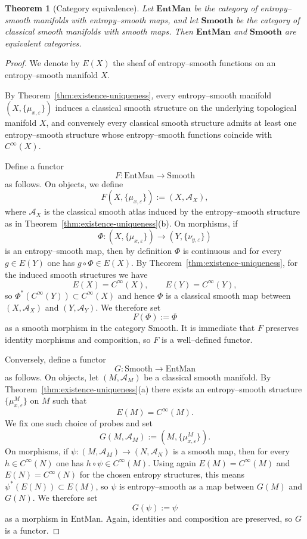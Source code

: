 \documentclass[11pt]{amsart}
\newtheorem{theorem}{Theorem}[section]
\theoremstyle{definition}
\theoremstyle{remark}
\begin{document}
\begin{theorem}[Category equivalence]
\label{thm:category-equivalence}
Let $\mathbf{EntMan}$ be the category of entropy--smooth manifolds with
entropy--smooth maps, and let $\mathbf{Smooth}$ be the category of
classical smooth manifolds with smooth maps.  Then $\mathbf{EntMan}$ and
$\mathbf{Smooth}$ are equivalent categories.
\end{theorem}
\begin{proof}
We denote by $E(X)$ the sheaf of entropy--smooth functions on an entropy--smooth
manifold $X$.

By Theorem~\ref{thm:existence-uniqueness}, every entropy--smooth manifold $(X,\{\mu_{x,\varepsilon}\})$ induces a
classical smooth structure on the underlying topological manifold $X$, and conversely
every classical smooth structure admits at least one entropy--smooth structure whose
entropy--smooth functions coincide with $C^\infty(X)$.

Define a functor
\[
F : \mathrm{EntMan} \longrightarrow \mathrm{Smooth}
\]
as follows. On objects, we define
\[
F(X,\{\mu_{x,\varepsilon}\}) := (X,\mathcal{A}_X),
\]
where $\mathcal{A}_X$ is the classical smooth atlas induced by the entropy--smooth
structure as in Theorem~\ref{thm:existence-uniqueness}(b). On morphisms, if
\[
\Phi:(X,\{\mu_{x,\varepsilon}\}) \longrightarrow (Y,\{\nu_{y,\varepsilon}\})
\]
is an entropy--smooth map, then by definition $\Phi$ is continuous and for every
$g\in E(Y)$ one has $g\circ \Phi \in E(X)$. By Theorem~\ref{thm:existence-uniqueness}, for the induced smooth
structures we have
\[
E(X) = C^\infty(X), \qquad E(Y) = C^\infty(Y),
\]
so $\Phi^*(C^\infty(Y)) \subset C^\infty(X)$ and hence $\Phi$ is a classical smooth map
between $(X,\mathcal{A}_X)$ and $(Y,\mathcal{A}_Y)$. We therefore set
\[
F(\Phi) := \Phi
\]
as a smooth morphism in the category $\mathrm{Smooth}$. It is immediate that $F$
preserves identity morphisms and composition, so $F$ is a well--defined functor.

Conversely, define a functor
\[
G : \mathrm{Smooth} \longrightarrow \mathrm{EntMan}
\]
as follows. On objects, let $(M,\mathcal{A}_M)$ be a classical smooth manifold.
By Theorem~\ref{thm:existence-uniqueness}(a) there exists an entropy--smooth structure
$\{\mu^{M}_{x,\varepsilon}\}$ on $M$ such that
\[
E(M) = C^\infty(M).
\]
We fix one such choice of probes and set
\[
G(M,\mathcal{A}_M) := (M,\{\mu^{M}_{x,\varepsilon}\}).
\]
On morphisms, if $\psi:(M,\mathcal{A}_M)\to(N,\mathcal{A}_N)$ is a smooth map, then
for every $h\in C^\infty(N)$ one has $h\circ\psi\in C^\infty(M)$. Using again
$E(M)=C^\infty(M)$ and $E(N)=C^\infty(N)$ for the chosen entropy structures, this
means $\psi^*(E(N))\subset E(M)$, so $\psi$ is entropy--smooth as a map between
$G(M)$ and $G(N)$. We therefore set
\[
G(\psi) := \psi
\]
as a morphism in $\mathrm{EntMan}$. Again, identities and composition are preserved,
so $G$ is a functor.



\end{proof}
\end{document}
